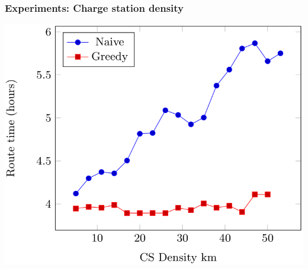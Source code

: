 \begin{frame}
  \frametitle{Experiments: Charge station density}
  \begin{center}
	  \includegraphics[scale=0.45]{images/CSdensity}  
  \end{center}
\end{frame}

